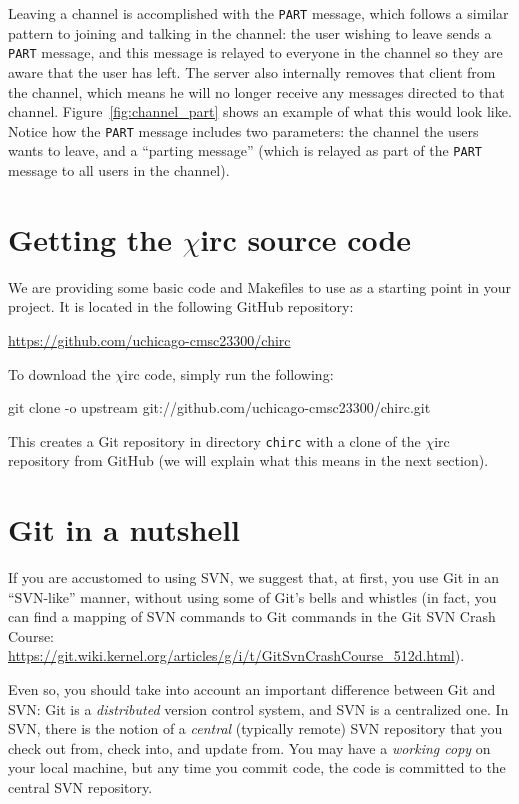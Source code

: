 \documentclass[10pt]{article}
\newcommand{\chirc}{$\chi$\textsf{irc} }
\newenvironment{example}%
{\VerbatimEnvironment\begin{Sbox}\begin{VerbExample}}%
{\end{VerbExample}\end{Sbox}\setlength{\fboxsep}{8pt}\begin{center}\fcolorbox{black}{backgroundgray}{\TheSbox}\end{center}}
\begin{document}
Leaving a channel is accomplished with the \texttt{PART} message, which follows a similar pattern to joining and talking in the channel: the user wishing to leave sends a \texttt{PART} message, and this message is relayed to everyone in the channel so they are aware that the user has left. The server also internally removes that client from the channel, which means he will no longer receive any messages directed to that channel. Figure~\ref{fig:channel_part} shows an example of what this would look like. Notice how the \texttt{PART} message includes two parameters: the channel the users wants to leave, and a ``parting message'' (which is relayed as part of the \texttt{PART} message to all users in the channel).

\section{Getting the \chirc source code}
\label{sec:code}

We are providing some basic code and Makefiles to use as a starting point in your project. It is located in the following GitHub repository:

\begin{center}
\url{https://github.com/uchicago-cmsc23300/chirc}
\end{center}

To download the \chirc code, simply run the following:

\begin{example}
git clone -o upstream git://github.com/uchicago-cmsc23300/chirc.git
\end{example}

This creates a Git repository in directory \texttt{chirc} with a clone of the \chirc repository from GitHub (we will explain what this means in the next section). 

\section{Git in a nutshell}
\label{sec:git}

If you are accustomed to using SVN, we suggest that, at first, you use Git in an ``SVN-like'' manner, without using some of Git's bells and whistles (in fact, you can find a mapping of SVN commands to Git commands in the Git SVN Crash Course: \url{https://git.wiki.kernel.org/articles/g/i/t/GitSvnCrashCourse_512d.html}).

Even so, you should take into account an important difference between Git and SVN: Git is a \emph{distributed} version control system, and SVN is a centralized one. In SVN, there is the notion of a \emph{central} (typically remote) SVN repository that you check out from, check into, and update from. You may have a \emph{working copy} on your local machine, but any time you commit code, the code is committed to the central SVN repository.
\end{document}
